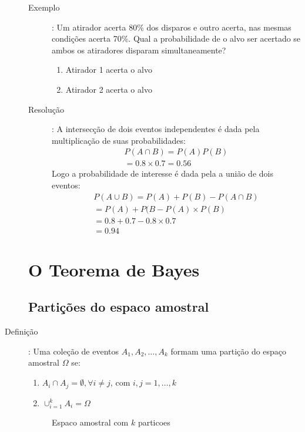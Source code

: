 \begin{description}
\begin{description}
    \item[Exemplo]: Um atirador acerta 80\% dos disparos e outro acerta, nas mesmas condições
      acerta 70\%. Qual a probabilidade de o alvo ser acertado se ambos os atiradores disparam simultaneamente?
      \begin{enumerate}[label=\Alph*:]
        \item  Atirador 1 acerta o alvo
        \item Atirador 2 acerta o alvo
      \end{enumerate}
    \item [Resolução]:
      A intersecção de dois eventos independentes é dada pela multiplicação de suas probabilidades:
      \begin{align*}
        P(A \cap B)= P(A)P(B)\\
        =0.8 \times 0.7= 0.56
      \end{align*}
      Logo a probabilidade de interesse é dada pela a união de dois eventos:
      \begin{align*}
        P(A \cup B)= P(A)+ P(B)- P( A \cap B )\\
        = P(A) + P(B- P(A)\times P(B)\\
        = 0.8+0.7 - 0.8\times 0.7\\
        =0.94
      \end{align*}

  \end{description}
  \section{O Teorema de Bayes}
  \subsection{Partições do espaco amostral}
\item[Definição]: Uma coleção de eventos $A_1, A_2, \ldots, A_k$ formam uma partição 
  do espaço amostral $\Omega$ se:

  \begin{enumerate}[leftmargin=*, label=\Roman*., widest=IV, align=left]
    \item $A_i \cap A_j = \emptyset, \forall i\neq j$, com $i,j =1,\ldots,k$
    \item $\cup_{i=1}^{k}A_i= \Omega$
  \end{enumerate}
  \begin{figure}[H]
    \centering
    
    \caption{Espaco amostral com $k$ particoes}
  \end{figure}
   \end{description}
